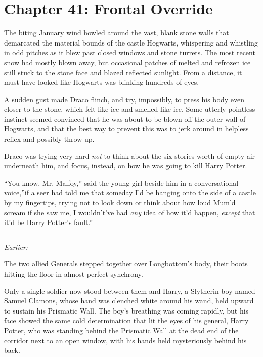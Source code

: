 \chapter{Chapter 41: Frontal Override}
The biting January wind howled around the vast, blank stone walls that
demarcated the material bounds of the castle Hogwarts, whispering and
whistling in odd pitches as it blew past closed windows and stone
turrets. The most recent snow had mostly blown away, but occasional
patches of melted and refrozen ice still stuck to the stone face and
blazed reflected sunlight. From a distance, it must have looked like
Hogwarts was blinking hundreds of eyes.

A sudden gust made Draco flinch, and try, impossibly, to press his body
even closer to the stone, which felt like ice and smelled like ice. Some
utterly pointless instinct seemed convinced that he was about to be
blown off the outer wall of Hogwarts, and that the best way to prevent
this was to jerk around in helpless reflex and possibly throw up.

Draco was trying very hard \emph{not} to think about the six stories
worth of empty air underneath him, and focus, instead, on how he was
going to kill Harry Potter.

``You know, Mr. Malfoy,'' said the young girl beside him in a
conversational voice,''if a seer had told me that someday I'd be hanging
onto the side of a castle by my fingertips, trying not to look down or
think about how loud Mum'd scream if she saw me, I wouldn't've had
\emph{any} idea of how it'd happen, \emph{except} that it'd be Harry
Potter's fault.''

\begin{center}\rule{3in}{0.4pt}\end{center}

\emph{Earlier:}

The two allied Generals stepped together over Longbottom's body, their
boots hitting the floor in almost perfect synchrony.

Only a single soldier now stood between them and Harry, a Slytherin boy
named Samuel Clamons, whose hand was clenched white around his wand,
held upward to sustain his Prismatic Wall. The boy's breathing was
coming rapidly, but his face showed the same cold determination that lit
the eyes of his general, Harry Potter, who was standing behind the
Prismatic Wall at the dead end of the corridor next to an open window,
with his hands held mysteriously behind his back.

